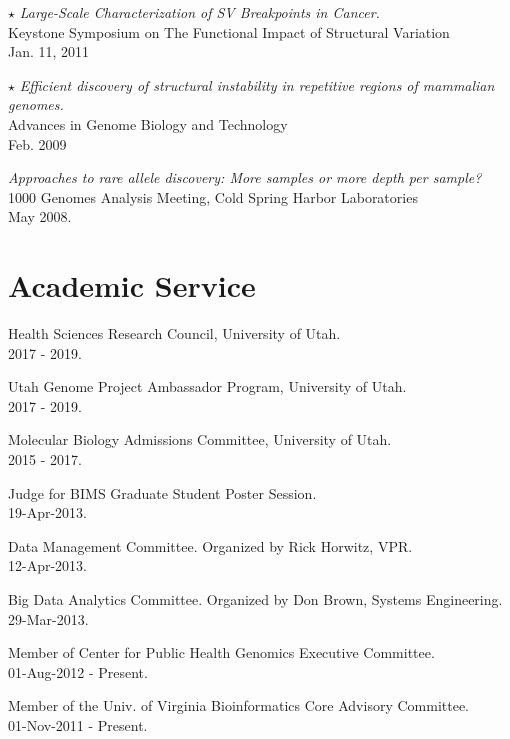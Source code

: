 \documentclass[margin,line]{cv}
\begin{document}
\begin{resume}
    $\star$ \textit{Large-Scale Characterization of SV Breakpoints in Cancer.} \\
    Keystone Symposium on The Functional Impact of Structural Variation \\
    Jan. 11, 2011

    $\star$ \textit{Efficient discovery of structural instability in repetitive regions of mammalian genomes.} \\
    Advances in Genome Biology and Technology \\
    Feb. 2009

    \textit{Approaches to rare allele discovery: More samples or more depth per sample? } \\
    1000 Genomes Analysis Meeting, Cold Spring Harbor Laboratories \\
    May 2008.

    \section{\mysidestyle Academic Service}

    Health Sciences Research Council, University of Utah. \\
    2017 - 2019.

    Utah Genome Project Ambassador Program, University of Utah. \\
    2017 - 2019.

    Molecular Biology Admissions Committee, University of Utah. \\
    2015 - 2017.

    Judge for BIMS Graduate Student Poster Session. \\
    19-Apr-2013.

    Data Management Committee. Organized by Rick Horwitz, VPR.\\
    12-Apr-2013.

    Big Data Analytics Committee. Organized by Don Brown, Systems Engineering.\\
    29-Mar-2013.

    Member of Center for Public Health Genomics Executive Committee.\\
    01-Aug-2012 - Present.

    \vspace{-2mm}
    Member of the Univ. of Virginia Bioinformatics Core Advisory Committee.\\
    01-Nov-2011 - Present.


\end{resume}
\end{document}
